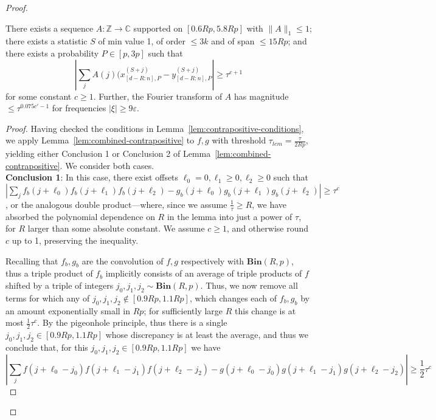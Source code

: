 \documentclass[10pt,a4paper]{amsart}
\newcommand{\Bin}[2]{\textbf{Bin}(#1,#2)}
\newcommand{\abs}[1]{\left|#1\right|}
\newcommand{\eps}{\varepsilon}
\begin{document}
\begin{proof}
\begin{lemma}
    \label{lem:coefficients-helper}
    There exists a sequence $A: \mathbb{Z} \rightarrow \mathbb{C}$ supported on $[0.6Rp,5.8Rp]$ with $\|A\|_1 \leq 1$; there exists a statistic $S$ of min value 1, of order $\leq 3k$ and of span $\leq 15Rp$; and there exists a probability $P \in [p,3p]$ such that 
    \begin{equation}\label{eq:combined-discrepancy-bound}
        \abs{\sum_j A(j) (x^{(S+j)}_{[d-R:n],P} - y^{(S+j)}_{[d-R:n],P}} \geq \tau^{c+1}
    \end{equation}
    for some constant $c \geq 1$. Further, the Fourier transform of $A$ has magnitude $\leq \tau^{0.075c'-1}$ for frequencies $|\xi| \geq 9\eps$. 
\end{lemma}
\begin{proof}
    Having checked the conditions in Lemma~\ref{lem:contrapositive-conditions}, we apply Lemma~\ref{lem:combined-contrapositive} to $f,g$ with threshold $\tau_{lem}=\frac{\tau}{2Rp}$, yielding either Conclusion 1 or Conclusion 2 of Lemma~\ref{lem:combined-contrapositive}. We consider both cases. \\
    
    \noindent \textbf{Conclusion 1}: In this case, there exist offsets $\ell_0=0,\ell_1\geq 0,\ell_2\geq 0$ such that $|\sum_j f_b(j+\ell_0)f_b(j+\ell_1)f_b(j+\ell_2)-g_b(j+\ell_0)g_b(j+\ell_1)g_b(j+\ell_2)|\geq \tau^c$, or the analogous double product---where, since we assume $\frac{1}{\tau}\geq R$, we have absorbed the polynomial dependence on $R$ in the lemma into just a power of $\tau$, for $R$ larger than some absolute constant. We assume $c\geq 1$, and otherwise round $c$ up to 1, preserving the inequality. 

    Recalling that $f_b,g_b$ are the convolution of $f,g$ respectively with $\Bin{R}{p}$, thus a triple product of $f_b$ implicitly consists of an average of triple products of $f$ shifted by a triple of integers $j_0,j_1,j_2\sim \Bin{R}{p}$. Thus, we now remove all terms for which any of $j_0,j_1,j_2\notin [0.9Rp,1.1Rp]$, which changes each of $f_b,g_b$ by an amount exponentially small in $Rp$; for sufficiently large $R$ this change is at most $\frac{1}{2}\tau^c$. By the pigeonhole principle, thus there is a single $j_0,j_1,j_2\in [0.9Rp,1.1Rp]$ whose discrepancy is at least the average, and thus we conclude that, for this $j_0,j_1,j_2\in [0.9Rp,1.1Rp]$ we have \begin{equation}\label{eq:triple-bound}|\sum_j f(j+\ell_0-j_0)f(j+\ell_1-j_1)f(j+\ell_2-j_2)-g(j+\ell_0-j_0)g(j+\ell_1-j_1)g(j+\ell_2-j_2)|\geq \frac{1}{2}\tau^c\end{equation}


\end{proof}
\end{proof}
\end{document}
